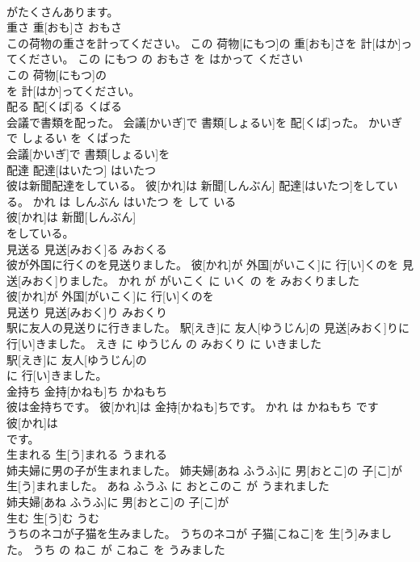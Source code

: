 \documentclass[8pt]{extreport}
\begin{document}
\begin{CJK}{UTF8}{min}
\\	がたくさんあります。			
\\	重さ	重[おも]さ	おもさ	
\\	この荷物の重さを計ってください。	この 荷物[にもつ]の 重[おも]さを 計[はか]ってください。	この にもつ の おもさ を はかって ください	
\\	この 荷物[にもつ]の
\\	を 計[はか]ってください。			
\\	配る	配[くば]る	くばる	
\\	会議で書類を配った。	会議[かいぎ]で 書類[しょるい]を 配[くば]った。	かいぎ で しょるい を くばった	
\\	会議[かいぎ]で 書類[しょるい]を
\\	配達	配達[はいたつ]	はいたつ	
\\	彼は新聞配達をしている。	彼[かれ]は 新聞[しんぶん] 配達[はいたつ]をしている。	かれ は しんぶん はいたつ を して いる	
\\	彼[かれ]は 新聞[しんぶん]
\\	をしている。			
\\	見送る	見送[みおく]る	みおくる	
\\	彼が外国に行くのを見送りました。	彼[かれ]が 外国[がいこく]に 行[い]くのを 見送[みおく]りました。	かれ が がいこく に いく の を みおくりました	
\\	彼[かれ]が 外国[がいこく]に 行[い]くのを
\\	見送り	見送[みおく]り	みおくり	
\\	駅に友人の見送りに行きました。	駅[えき]に 友人[ゆうじん]の 見送[みおく]りに 行[い]きました。	えき に ゆうじん の みおくり に いきました	
\\	駅[えき]に 友人[ゆうじん]の
\\	に 行[い]きました。			
\\	金持ち	金持[かねも]ち	かねもち	
\\	彼は金持ちです。	彼[かれ]は 金持[かねも]ちです。	かれ は かねもち です	
\\	彼[かれ]は
\\	です。			
\\	生まれる	生[う]まれる	うまれる	
\\	姉夫婦に男の子が生まれました。	姉夫婦[あね ふうふ]に 男[おとこ]の 子[こ]が 生[う]まれました。	あね ふうふ に おとこのこ が うまれました	
\\	姉夫婦[あね ふうふ]に 男[おとこ]の 子[こ]が
\\	生む	生[う]む	うむ	
\\	うちのネコが子猫を生みました。	うちのネコが 子猫[こねこ]を 生[う]みました。	うち の ねこ が こねこ を うみました	

\end{CJK}
\end{document}
